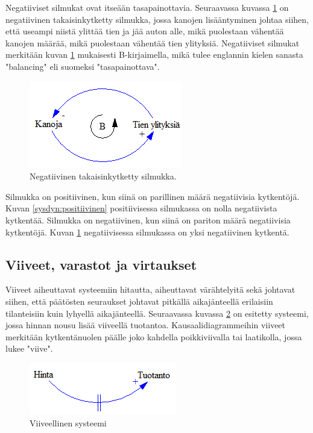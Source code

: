 \documentclass[finnish,12pt,a4paper,pdftex]{article}
\begin{document}
\begin{onehalfspacing}
Negatiiviset silmukat ovat itseään tasapainottavia. Seuraavassa kuvassa \ref{sysdyn:negatiivinen} on negatiivinen takaisinkytketty silmukka, jossa kanojen lisääntyminen johtaa siihen, että useampi niistä ylittää tien ja jää auton alle, mikä puolestaan vähentää kanojen määrää, mikä puolestaan vähentää tien ylityksiä. Negatiiviset silmukat merkitään kuvan \ref{sysdyn:negatiivinen} mukaisesti B-kirjaimella, mikä tulee englannin kielen sanasta "balancing" eli suomeksi "tasapainottava". \cite[s. 12--14]{Sterman2000}

\begin{figure}[H]
\centering \includegraphics{negatiivinen}
\caption{Negatiivinen takaisinkytketty silmukka. \cite[s. 13]{Sterman2000} \label{sysdyn:negatiivinen}}
\end{figure}

Silmukka on positiivinen, kun siinä on parillinen määrä negatiivisia kytkentöjä. Kuvan \ref{sysdyn:positiivinen} positiivisessa silmukassa on nolla negatiivista kytkentää. Silmukka on negatiivinen, kun siinä on pariton määrä negatiivisia kytkentöjä. Kuvan \ref{sysdyn:negatiivinen} negatiivisessa silmukassa on yksi negatiivinen kytkentä. \cite[s. 12--14]{Sterman2000}

\subsection{Viiveet, varastot ja virtaukset \label{sysdyn:vvv}}

Viiveet aiheuttavat systeemiin hitautta, aiheuttavat värähtelyitä sekä johtavat siihen, että päätösten seuraukset johtavat pitkällä aikajänteellä erilaisiin tilanteisiin kuin lyhyellä aikajänteellä. Seuraavassa kuvassa \ref{sysdyn:viive} on esitetty systeemi, jossa hinnan nousu lisää viiveellä tuotantoa. Kausaalidiagrammeihin viiveet merkitään kytkentänuolen päälle joko kahdella poikkiviivalla tai laatikolla, jossa lukee "viive". \cite[s. 150--152]{Sterman2000} 

\begin{figure}[H]
\centering \includegraphics{viive}
\caption{Viiveellinen systeemi \cite[s. 150]{Sterman2000} \label{sysdyn:viive}}
\end{figure}


\end{onehalfspacing}
\end{document}
